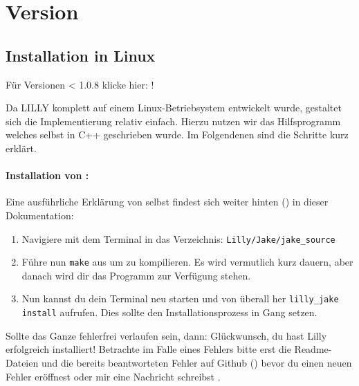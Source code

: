 \section{Version \small{}}
\subsection{Installation in Linux}
\begin{center}
    Für Versionen < 1.0.8 klicke hier: !
\end{center}
Da LILLY komplett auf einem Linux-Betriebsystem entwickelt wurde, gestaltet sich die Implementierung relativ einfach.
Hierzu nutzen wir das Hilfsprogramm \Jake welches selbst in C++ geschrieben wurde.
Im Folgendenen sind die Schritte kurz erklärt.
\paragraph{Installation von \Jake:}Eine ausführliche Erklärung von \Jake selbst findest sich weiter hinten () in dieser Dokumentation:\smallskip
{}
\begin{enumerate}\setlength{\itemsep}{0.25\baselineskip}
    \item Navigiere mit dem Terminal in das Verzeichnis: \verb|Lilly/Jake/jake_source|
    \item Führe nun \verb|make| aus um \Jake zu kompilieren.
          Es wird vermutlich kurz dauern, aber danach wird dir das Programm \LJake zur Verfügung stehen.
    \item Nun kannst du dein Terminal neu starten und von überall her \verb|lilly_jake install| aufrufen.
          Dies sollte den Installationsprozess in Gang setzen.\smallskip
\end{enumerate}
Sollte das Ganze fehlerfrei verlaufen sein, dann: Glückwunsch, du hast Lilly erfolgreich installiert!
Betrachte im Falle eines Fehlers bitte erst die Readme-Dateien und die bereits beantworteten Fehler
auf Github (\href{https://github.com/EagleoutIce/LILLY/issues}{\faGithub}) bevor du einen neuen Fehler
eröffnest oder mir eine Nachricht schreibst \Smiley.
